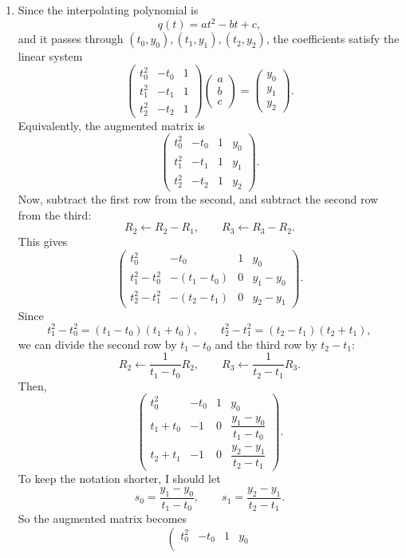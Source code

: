 \documentclass[10pt]{extarticle}
\begin{document}
\begin{enumerate}[label=(\alph*)]
\item Since the interpolating polynomial is
\[
q(t)=at^2-bt+c,
\]
and it passes through $(t_0,y_0),(t_1,y_1),(t_2,y_2)$, the coefficients satisfy the linear system
\[
\begin{pmatrix}
t_0^2 & -t_0 & 1\\
t_1^2 & -t_1 & 1\\
t_2^2 & -t_2 & 1
\end{pmatrix}
\begin{pmatrix}
a\\b\\c
\end{pmatrix}
=
\begin{pmatrix}
y_0\\y_1\\y_2
\end{pmatrix}.
\]
Equivalently, the augmented matrix is
\[
\left(
\begin{array}{ccc|c}
t_0^2 & -t_0 & 1 & y_0\\
t_1^2 & -t_1 & 1 & y_1\\
t_2^2 & -t_2 & 1 & y_2
\end{array}
\right).
\]
Now, subtract the first row from the second, and subtract the second row from the third:
\[
R_2\leftarrow R_2-R_1,
\qquad
R_3\leftarrow R_3-R_2.
\]
This gives
\[
\left(
\begin{array}{ccc|c}
t_0^2 & -t_0 & 1 & y_0\\
t_1^2-t_0^2 & -(t_1-t_0) & 0 & y_1-y_0\\
t_2^2-t_1^2 & -(t_2-t_1) & 0 & y_2-y_1
\end{array}
\right).
\]
Since
\[
t_1^2-t_0^2=(t_1-t_0)(t_1+t_0),
\qquad
t_2^2-t_1^2=(t_2-t_1)(t_2+t_1),
\]
we can divide the second row by $t_1-t_0$ and the third row by $t_2-t_1$:
\[
R_2\leftarrow \frac{1}{t_1-t_0}R_2,
\qquad
R_3\leftarrow \frac{1}{t_2-t_1}R_3.
\]
Then,
\[
\left(
\begin{array}{ccc|c}
t_0^2 & -t_0 & 1 & y_0\\
t_1+t_0 & -1 & 0 & \dfrac{y_1-y_0}{t_1-t_0}\\[0.9em]
t_2+t_1 & -1 & 0 & \dfrac{y_2-y_1}{t_2-t_1}
\end{array}
\right).
\]
To keep the notation shorter, I should let
\[
s_0=\frac{y_1-y_0}{t_1-t_0},
\qquad
s_1=\frac{y_2-y_1}{t_2-t_1}.
\]
So the augmented matrix becomes
\[
\left(
\begin{array}{ccc|c}
t_0^2 & -t_0 & 1 & y_0\\

\end{array}\]
\end{enumerate}
\end{document}
